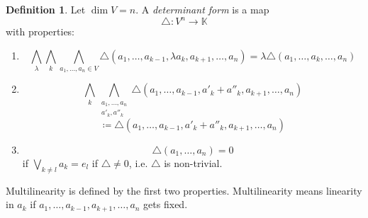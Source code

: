 \documentclass[a4paper,landscape,twocolumn]{article}
\theoremstyle{definition}
\newtheorem{defi}{Definition}
\begin{document}
\begin{defi}
  Let $\dim{V} = n$. A \emph{determinant form} is a map
  \[ \triangle: V^n \to \mathbb K \]
  with properties:
  \begin{enumerate}
    \item
      \[
        \bigwedge_{\lambda} \bigwedge_{k} \bigwedge_{a_1,\ldots,a_n \in V}
        \triangle (a_1, \ldots, a_{k-1}, \lambda a_k, a_{k+1}, \ldots, a_n)
        = \lambda \triangle (a_1, \ldots, a_k, \ldots, a_n)
      \]
    \item
      \[
        \bigwedge_k \bigwedge_{\substack{a_1, \ldots, a_n \\ a'_k, a''_k}}
        \triangle(a_1, \ldots, a_{k-1}, a'_k + a''_k, a_{k+1}, \ldots, a_n)
      \] \[
        \coloneqq \triangle(a_1, \ldots, a_{k-1}, a'_k + a''_k, a_{k+1}, \ldots, a_n)
      \]
    \item
      \[ \triangle(a_1, \ldots, a_n) = 0 \]
      if $\bigvee_{k \neq l} a_k = e_l$
      if $\triangle \neq 0$, i.e. $\triangle$ is non-trivial.
  \end{enumerate}
  Multilinearity is defined by the first two properties.
  Multilinearity means linearity in $a_k$ if $a_1, \ldots, a_{k-1}, a_{k+1}, \ldots, a_n$
  gets fixed.
\end{defi}
\end{document}
